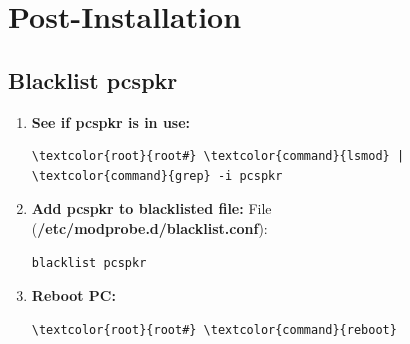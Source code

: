 \documentclass[10pt, a4paper, onecolumn, oneside, titlepage, openany]{book}
\begin{document}
\chapter{Post-Installation}
\section{Blacklist pcspkr}
\begin{enumerate}
    \item \textbf{See if pcspkr is in use:}
\begin{Verbatim}[commandchars=\\\{\}]
\textcolor{root}{root#} \textcolor{command}{lsmod} | \textcolor{command}{grep} -i pcspkr
\end{Verbatim}
    \item \textbf{Add pcspkr to blacklisted file:}
\newline File (\textbf{\textcolor{file}{/etc/modprobe.d/blacklist.conf}}):
\begin{Verbatim}[commandchars=\\\{\}]
blacklist pcspkr
\end{Verbatim}
    \item \textbf{Reboot PC:}
\begin{Verbatim}[commandchars=\\\{\}]
\textcolor{root}{root#} \textcolor{command}{reboot}
\end{Verbatim}
\end{enumerate}
\end{document}
